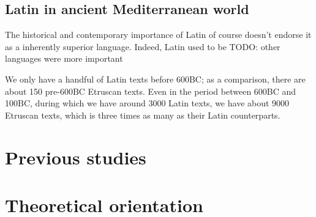 \documentclass[a4paper, oneside]{report}
\begin{document}
\subsection{Latin in ancient Mediterranean world}

The historical and contemporary importance of Latin 
of course doesn't endorse it as a inherently superior language. 
Indeed, Latin used to be TODO: other languages were more important

We only have a handful of Latin texts before 600BC; 
as a comparison, there are about 150 pre-600BC Etruscan texts.
Even in the period between 600BC and 100BC, 
during which we have around 3000 Latin texts,
we have about 9000 Etruscan texts, 
which is three times as many as their Latin counterparts. 


\section{Previous studies}

\section{Theoretical orientation}\label{sec:theoretical-orientation}
\end{document}
